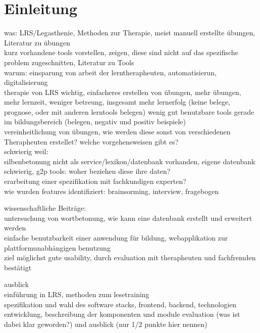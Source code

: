 
\chapter{Einleitung}

was: LRS/Legasthenie, Methoden zur Therapie, meist manuell erstellte übungen, Literatur zu übungen\\
kurz vorhandene tools vorstellen, zeigen, diese sind nicht auf das spezifische problem zugeschnitten, Literatur zu Tools\\

warum: einsparung von arbeit der lerntherapheuten, automatisierun, digitalisierung\\
therapie von LRS wichtig, einfacheres erstellen von übungen, mehr übungen, mehr lernzeit, weniger betreung, insgesamt mehr lernerfolg (keine belege, prognose, oder mit anderen lerntools belegen)
wenig gut benutzbare tools gerade im bildungsbereich (belegen, negativ und positiv beispiele)\\
vereinheitlichung von übungen, wie werden diese sonst von verschiedenen Therapheuten erstellet? welche vorgehensweisen gibt es?\\
schwierig weil: \\
silbenbetonung nicht als service/lexikon/datenbank vorhanden, eigene datenbank schwierig, g2p tools: woher beziehen diese ihre daten?\\
erarbeitung einer spezifikation mit fachkundigen experten? \\
wie wurden features identifiziert: brainsorming, interview, fragebogen


wissenschaftliche Beiträge: \\
untersuchung von wortbetonung, wie kann eine datenbank erstellt und erweitert werden\\
einfache benutzbarkeit einer anwendung für bildung, webapplikation zur plattformunabhängigen benutzung\\
ziel möglichst gute usability, durch evaluation mit therapheuten und fachfremden bestätigt

ausblick\\
einführung in LRS, methoden zum lesetraining\\
spezifikation und wahl des software stacks, frontend, backend, technologien\\
entwicklung, beschreibung der komponenten und module
evaluation (was ist dabei klar geworden?) und ausblick (nur 1/2 punkte hier nennen)